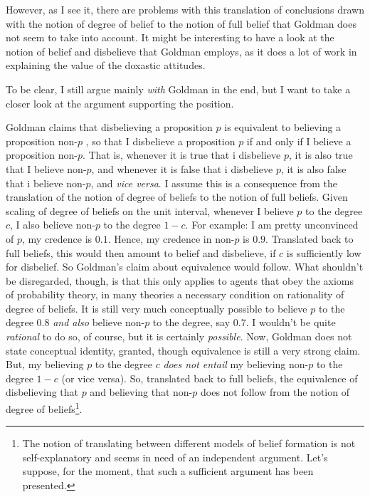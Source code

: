 \documentclass[12pt,numbers=noenddot]{scrartcl}
\begin{document}
However, as I see it, there are problems with this translation of conclusions drawn with the notion of degree of belief to the notion of full belief that Goldman does not seem to take into account. It might be interesting to have a look at the notion of belief and disbelieve that Goldman employs, as it does a lot of work in explaining the value of the doxastic attitudes.

To be clear, I still argue mainly \emph{with} Goldman in the end, but I want to take a closer look at the argument supporting the position.

Goldman claims that disbelieving a proposition $p$ is equivalent to believing a proposition non-$p$ \textcite[58]{Goldman2002-GOLTUO-2}, so that I disbelieve a proposition $p$ if and only if I believe a proposition non-$p$. That is, whenever it is true that i disbelieve $p$, it is also true that I believe non-$p$, and whenever it is false that i disbelieve $p$, it is also false that i believe non-$p$, and \emph{vice versa}. 
I assume this is a consequence from the translation of the notion of degree of beliefs to the notion of full beliefs. Given scaling of degree of beliefs on the unit interval, whenever I believe $p$ to the degree $c$, I also believe non-$p$ to the degree $1-c$. For example: I am pretty unconvinced of $p$, my credence is $0.1$. Hence, my credence in non-$p$ is $0.9$. Translated back to full beliefs, this would then amount to belief and disbelieve, if $c$ is sufficiently low for disbelief. 
So Goldman's claim about equivalence would follow. What shouldn't be disregarded, though, is that this only applies to agents that obey the axioms of probability theory, in many theories a necessary condition on rationality of degree of beliefs. It is still very much conceptually possible to believe $p$ to the degree $0.8$ \emph{and also} believe non-$p$ to the degree, say $0.7$. I wouldn't be quite \emph{rational} to do so, of course, but it is certainly \emph{possible}. Now, Goldman does not state conceptual identity, granted, though equivalence is still a very strong claim. But, my believing $p$ to the degree $c$ \emph{does not entail} my believing non-$p$ to the degree $1-c$ (or vice versa). 
So, translated back to full beliefs, the equivalence of disbelieving that $p$ and believing that non-$p$ does not follow from the notion of degree of beliefs\footnote{The notion of translating between different models of belief formation is not self-explanatory and seems in need of an independent argument. Let's suppose, for the moment, that such a sufficient argument has been presented.}.
\end{document}
